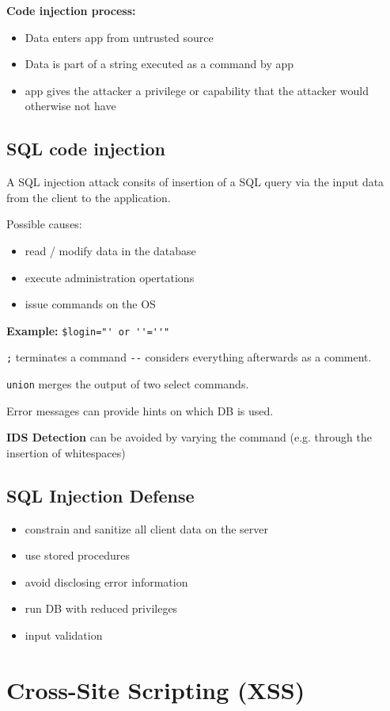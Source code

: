 \documentclass[fs, footer]{latex4ei}
\begin{document}
\begin{multicols*}{4}
\textbf{Code injection process:}
\begin{itemize}
	\item Data enters app from untrusted source
	\item Data is part of a string executed as a command by app
	\item app gives the attacker a privilege or capability that the attacker would otherwise not have
\end{itemize}

\subsection{SQL code injection} 
A SQL injection attack consits of insertion of a SQL query via the input data from the client to the application.

Possible causes:
\begin{itemize}
	\item read / modify data in the database
	\item execute administration opertations
	\item issue commands on the OS
\end{itemize}

\textbf{Example:} \lstinline|$login="' or ''=''"|

\lstinline|;| terminates a command \lstinline|--| considers everything afterwards as a comment.

\lstinline|union| merges the output of two select commands.

Error messages can provide hints on which DB is used.

\textbf{IDS Detection} can be avoided by varying the command (e.g. through the insertion of whitespaces)

\subsection{SQL Injection Defense}
\begin{itemize}
	\item constrain and sanitize all client data on the server
	\item use stored procedures
	\item avoid disclosing error information
	\item run DB with reduced privileges
	\item input validation
\end{itemize}

\section{Cross-Site Scripting (XSS)}

\end{multicols*}
\end{document}
